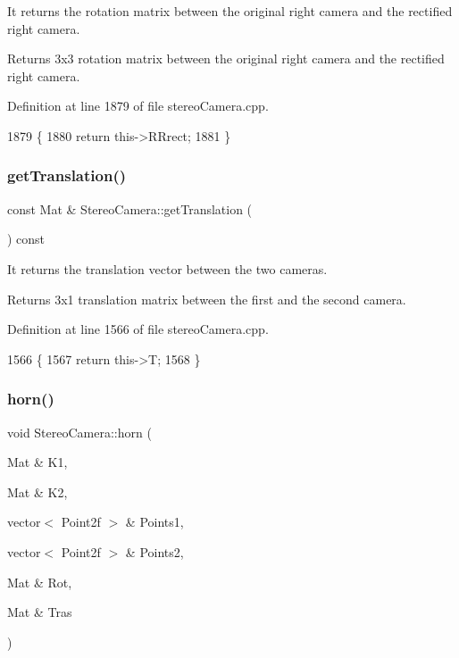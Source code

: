 It returns the rotation matrix between the original right camera and the rectified right camera. 

\begin{DoxyReturn}{Returns}
3x3 rotation matrix between the original right camera and the rectified right camera. 
\end{DoxyReturn}


Definition at line 1879 of file stereo\+Camera.\+cpp.


\begin{DoxyCode}
1879                                          \{
1880     \textcolor{keywordflow}{return} this->RRrect;
1881 \}
\end{DoxyCode}
\mbox{\label{classStereoCamera_a3ca6d46fc45835bff5fa0a5753ca40c0}} 
\subsubsection{\texorpdfstring{get\+Translation()}{getTranslation()}}
{\footnotesize\ttfamily const Mat \& Stereo\+Camera\+::get\+Translation (\begin{DoxyParamCaption}{ }\end{DoxyParamCaption}) const}



It returns the translation vector between the two cameras. 

\begin{DoxyReturn}{Returns}
3x1 translation matrix between the first and the second camera. 
\end{DoxyReturn}


Definition at line 1566 of file stereo\+Camera.\+cpp.


\begin{DoxyCode}
1566                                               \{
1567     \textcolor{keywordflow}{return} this->T;
1568 \}
\end{DoxyCode}
\mbox{\label{classStereoCamera_adf155975709fdbf09d3133899d074a02}} 
\subsubsection{\texorpdfstring{horn()}{horn()}}
{\footnotesize\ttfamily void Stereo\+Camera\+::horn (\begin{DoxyParamCaption}\item[{Mat \&}]{K1,  }\item[{Mat \&}]{K2,  }\item[{vector$<$ Point2f $>$ \&}]{Points1,  }\item[{vector$<$ Point2f $>$ \&}]{Points2,  }\item[{Mat \&}]{Rot,  }\item[{Mat \&}]{Tras }\end{DoxyParamCaption})}



